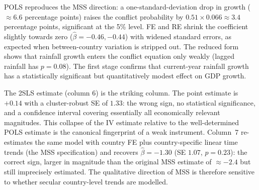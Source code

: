 \documentclass[11pt,a4paper]{article}
\begin{document}
POLS reproduces the MSS direction: a one-standard-deviation drop in
growth ($\approx 6.6$ percentage points) raises the conflict
probability by $0.51 \times 0.066 \approx 3.4$ percentage points,
significant at the 5\% level. FE and RE shrink the coefficient slightly
towards zero ($\hat\beta = -0.46, -0.44$) with widened standard errors,
as expected when between-country variation is stripped out. The reduced
form shows that rainfall growth enters the conflict equation only
weakly (lagged rainfall has $p = 0.08$). The first stage confirms that
current-year rainfall growth has a statistically significant but
quantitatively modest effect on GDP growth.

The 2SLS estimate (column 6) is the striking column. The point estimate
is $+0.14$ with a cluster-robust SE of $1.33$: the wrong sign, no
statistical significance, and a confidence interval covering essentially
all economically relevant magnitudes. This collapse of the IV estimate
relative to the well-determined POLS estimate is the canonical
fingerprint of a weak instrument. Column~7 re-estimates the same model
with country FE plus country-specific linear time trends (the MSS
specification) and recovers $\hat\beta = -1.30$ (SE $1.07$, $p = 0.23$):
the correct sign, larger in magnitude than the original MSS estimate of
$\approx -2.4$ but still imprecisely estimated. The qualitative
direction of MSS is therefore sensitive to whether secular
country-level trends are modelled.
\end{document}
